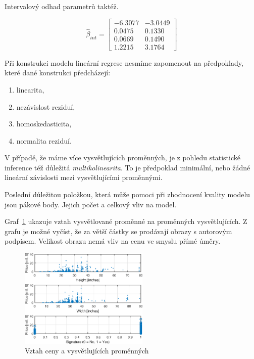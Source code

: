 Intervalový odhad parametrů taktéž.

\begin{equation}
    \hat{\beta}_{int} = \left[\begin{matrix} -6.3077 & -3.0449 \\ 0.0475 & 0.1330 \\ 0.0669 & 0.1490 \\ 1.2215 & 3.1764 \end{matrix}\right]
\end{equation}

Při konstrukci modelu lineární regrese nesmíme zapomenout na předpoklady, které dané konstrukci předcházejí:

\begin{enumerate}
    \item linearita,
    \item nezávislost reziduí,
    \item homoskedasticita,
    \item normalita reziduí.
\end{enumerate}

V případě, že máme více vysvětlujících proměnných, je z pohledu statistické inference též důležitá \textit{multikolinearita}.
To je předpoklad minimální, nebo žádné lineární závislosti mezi vysvětlujícími proměnnými.

Poslední důležitou položkou, která může pomoci při zhodnocení kvality modelu jsou pákové body.
Jejich počet a celkový vliv na model.

Graf~\ref{fig:lr1} ukazuje vztah vysvětlované proměnné na proměnných vysvětlujících.
Z grafu je možné vyčíst, že za větší částky se prodávají obrazy s autorovým podpisem.
Velikost obrazu nemá vliv na cenu ve smyslu přímé úměry.

\begin{figure}[htb]
    \centering
    \includegraphics[width=0.55\textwidth]{graphs/fig1.eps}
    \caption{Vztah ceny a vysvětlujících proměnných}
    \label{fig:lr1}
\end{figure}
\FloatBarrier

